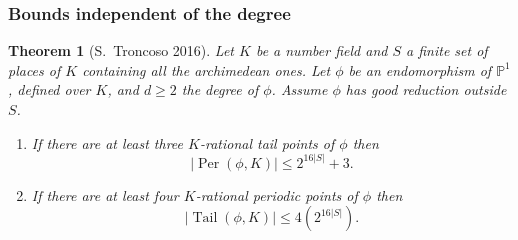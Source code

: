 \documentclass{beamer}
\def\PP{{\mathbb P}}
\def\QQ{{\mathbb Q}}
\DeclareMathOperator{\Tail}{Tail}
\DeclareMathOperator{\Per}{Per}
\theoremstyle{thmstyle}
\newtheorem*{mythm}{Theorem}
\theoremstyle{mystyle}
\theoremstyle{qstnstyle}
\begin{document}
%
% 
%





\begin{frame}
\frametitle{Bounds independent of the degree}
\begin{mythm}[S.\ Troncoso 2016]
Let $K$ be a number field and $S$ a finite set of places of $K$ containing all the archimedean ones. Let $\phi $ be an endomorphism of $\PP^1$, defined over $K$, and $d \geq 2$ the degree of $\phi$. Assume $\phi$ has  good reduction outside $S$.
\begin{enumerate}

\item [(a)] \label{th 3 periodic}
If there are at least three $K$-rational tail points of $\phi$ then
$$|\Per(\phi,K)| \leq 2^{16|S|}+3. $$

\item [(b)] \label{th 4 preperiodic}
If there are at least four $K$-rational periodic points of $\phi$ then
$$|\Tail(\phi,K)| \leq 4(2^{16|S|}).$$
\end{enumerate}
\end{mythm}
\end{frame}
\end{document}
